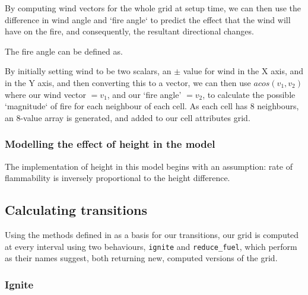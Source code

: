 \documentclass[11pt, a4paper, titlepage]{article}
\newcommand{\code}[1]{\colorbox{light-gray}{\texttt{#1}}}
\begin{document}
By computing wind vectors for the whole grid at setup time, we can then use the difference in wind angle and `fire angle` to predict the effect that the wind will have on the fire, and consequently, the resultant directional changes.

The fire angle can be defined as.

By initially setting wind to be two scalars, an  $\pm$ value for wind in the X axis, and in the Y axis, and then converting this to a vector, we can then use $acos(v_1,v_2)$ where our wind vector $= v_1$, and our `fire angle' $= v_2$, to calculate the possible `magnitude` of fire for each neighbour of each cell. As each cell has 8 neighbours, an 8-value array is generated, and added to our cell attributes grid.

\subsubsection{Modelling the effect of height in the model}
The implementation of height in this model begins with an assumption: rate of flammability is inversely proportional to the height difference.

\subsection{Calculating transitions}

Using the methods defined in \cite{ALEXANDRIDIS2008191} as a basis for our transitions, our grid is computed at every interval using two behaviours, \code{ignite} and \code{reduce\_fuel}, which perform as their names suggest, both returning new, computed versions of the grid.

\subsubsection{Ignite}


\end{document}
